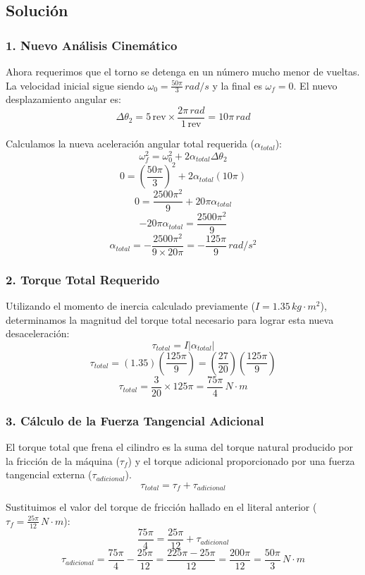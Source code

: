 \documentclass[12pt, a4paper]{article}
\begin{document}
\subsection*{Solución}

\subsubsection*{1. Nuevo Análisis Cinemático}
Ahora requerimos que el torno se detenga en un número mucho menor de vueltas. La velocidad inicial sigue siendo $\omega_0 = \frac{50\pi}{3} \, \si{rad/s}$ y la final es $\omega_f = 0$.
El nuevo desplazamiento angular es:
$$\Delta \theta_2 = 5 \, \text{rev} \times \frac{2\pi \, \si{rad}}{1 \, \text{rev}} = 10\pi \, \si{rad}$$

Calculamos la nueva aceleración angular total requerida ($\alpha_{total}$):
$$\omega_f^2 = \omega_0^2 + 2 \alpha_{total} \Delta \theta_2$$
$$0 = \left(\frac{50\pi}{3}\right)^2 + 2 \alpha_{total} (10\pi)$$
$$0 = \frac{2500\pi^2}{9} + 20\pi \alpha_{total}$$
$$-20\pi \alpha_{total} = \frac{2500\pi^2}{9}$$
$$\alpha_{total} = -\frac{2500\pi^2}{9 \times 20\pi} = -\frac{125\pi}{9} \, \si{rad/s^2}$$

\subsubsection*{2. Torque Total Requerido}
Utilizando el momento de inercia calculado previamente ($I = 1.35 \, \si{kg\cdot m^2}$), determinamos la magnitud del torque total necesario para lograr esta nueva desaceleración:
$$\tau_{total} = I |\alpha_{total}|$$
$$\tau_{total} = (1.35) \left( \frac{125\pi}{9} \right) = \left( \frac{27}{20} \right) \left( \frac{125\pi}{9} \right)$$
$$\tau_{total} = \frac{3}{20} \times 125\pi = \frac{75\pi}{4} \, \si{N\cdot m}$$

\subsubsection*{3. Cálculo de la Fuerza Tangencial Adicional}
El torque total que frena el cilindro es la suma del torque natural producido por la fricción de la máquina ($\tau_f$) y el torque adicional proporcionado por una fuerza tangencial externa ($\tau_{adicional}$).
$$\tau_{total} = \tau_f + \tau_{adicional}$$

Sustituimos el valor del torque de fricción hallado en el literal anterior ($\tau_f = \frac{25\pi}{12} \, \si{N\cdot m}$):
$$\frac{75\pi}{4} = \frac{25\pi}{12} + \tau_{adicional}$$
$$\tau_{adicional} = \frac{75\pi}{4} - \frac{25\pi}{12} = \frac{225\pi - 25\pi}{12} = \frac{200\pi}{12} = \frac{50\pi}{3} \, \si{N\cdot m}$$
\end{document}
